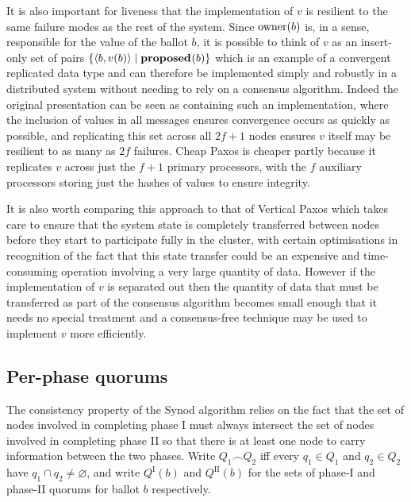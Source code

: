 \documentclass[journal]{IEEEtran}
\begin{document}
It is also important for liveness that the implementation of $v$ is resilient
to the same failure modes as the rest of the system. Since $\mathrm{owner}(b)$ is, in a
sense, responsible for the value of the ballot $b$, it is possible to think of
$v$ as an insert-only set of pairs ${\{ \langle b, v(b) \rangle \mid \mathbf{proposed}_{}(b)
\}}$ which is an example of a convergent replicated data type\cite{crdts} and
can therefore be implemented simply and robustly in a distributed system
without needing to rely on a consensus algorithm.  Indeed the original
presentation can be seen as containing such an implementation, where the
inclusion of values in all messages ensures convergence occurs as quickly as
possible, and replicating this set across all ${2f+1}$ nodes ensures $v$ itself
may be resilient to as many as $2f$ failures.  Cheap Paxos\cite{cheap-paxos} is
cheaper partly because it replicates $v$ across just the ${f+1}$ primary
processors, with the $f$ auxiliary processors storing just the hashes of values
to ensure integrity.

It is also worth comparing this approach to that of Vertical
Paxos\cite{vertical-paxos} which takes care to ensure that the system state is
completely transferred between nodes before they start to participate fully in
the cluster, with certain optimisations in recognition of the fact that this
state transfer could be an expensive and time-consuming operation involving a
very large quantity of data. However if the implementation of $v$ is separated
out then the quantity of data that must be transferred as part of the consensus
algorithm becomes small enough that it needs no special treatment and a
consensus-free technique may be used to implement $v$ more efficiently.

\subsection{Per-phase quorums}\label{per-phase-quorums}

\def\I#1#2{{#1}^\textrm{I}_{#2}}
\def\II#1#2{{#1}^\textrm{II}_{#2}}
\def\QI#1{\I{Q}{#1}}
\def\QII#1{\II{Q}{#1}}

The consistency property of the Synod algorithm relies on the fact that the set
of nodes involved in completing phase I must always intersect the set of nodes
involved in completing phase II so that there is at least one node to carry
information between the two phases. Write $Q_1 \frown Q_2$ iff every $q_1 \in
Q_1$ and $q_2 \in Q_2$ have ${q_1 \cap q_2 \ne \varnothing}$, and write
$\QI{}(b)$ and $\QII{}(b)$ for the sets of phase-I and phase-II quorums for
ballot $b$ respectively.
\end{document}
